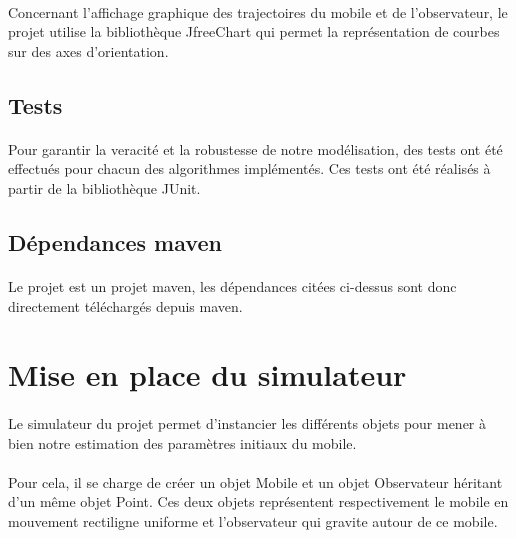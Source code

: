 \documentclass[a4paper,11pt]{article}
\begin{document}
		\paragraph{}
		Concernant l'affichage graphique des trajectoires du mobile et de l'observateur, le projet utilise la bibliothèque JfreeChart qui permet la représentation de courbes sur des axes d'orientation.

		\subsection{Tests}
		\paragraph{}
		Pour garantir la veracité et la robustesse de notre modélisation, des tests ont été effectués pour chacun des algorithmes implémentés. Ces tests ont été réalisés à partir de la bibliothèque JUnit.

		\subsection{Dépendances maven}
		\paragraph{}
		Le projet est un projet maven, les dépendances citées ci-dessus sont donc directement téléchargés depuis maven.


		\newpage

	\section{Mise en place du simulateur}

		\paragraph{}
		Le simulateur du projet permet d'instancier les différents objets pour mener à bien notre estimation des paramètres initiaux du mobile.

		\paragraph{}
		Pour cela, il se charge de créer un objet Mobile et un objet Observateur héritant d'un même objet Point. Ces deux objets représentent respectivement le mobile en mouvement rectiligne uniforme et l'observateur qui gravite autour de ce mobile.
\end{document}
